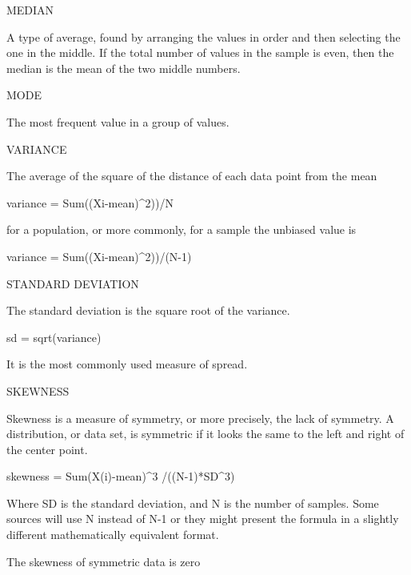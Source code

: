 M\+E\+D\+I\+AN \begin{DoxyVerb}   A type of average, found by arranging the values in
   order and then selecting the one in the middle. If the
   total number of values in the sample is even, then the
   median is the mean of the two middle numbers.
\end{DoxyVerb}


M\+O\+DE \begin{DoxyVerb}   The most frequent value in a group of values.
\end{DoxyVerb}


V\+A\+R\+I\+A\+N\+CE \begin{DoxyVerb}   The average of the square of the distance of each
   data point from the mean

      variance = Sum((Xi-mean)^2))/N

   for a population, or more commonly, for a sample the
   unbiased value is

      variance = Sum((Xi-mean)^2))/(N-1)
\end{DoxyVerb}


S\+T\+A\+N\+D\+A\+RD D\+E\+V\+I\+A\+T\+I\+ON \begin{DoxyVerb}   The standard deviation is the square root of the
   variance.

      sd = sqrt(variance)

   It is the most commonly used measure of spread.
\end{DoxyVerb}


S\+K\+E\+W\+N\+E\+SS \begin{DoxyVerb}   Skewness is a measure of symmetry, or more
   precisely, the lack of symmetry. A distribution, or
   data set, is symmetric if it looks the same to the left
   and right of the center point.

      skewness = Sum{(X(i)-mean)^3} /((N-1)*SD^3)

   Where SD is the standard deviation, and N is the number of
   samples. Some sources will use N instead of N-1 or they might
   present the formula in a slightly different mathematically
   equivalent format.

      The skewness of symmetric data is zero
\end{DoxyVerb}


